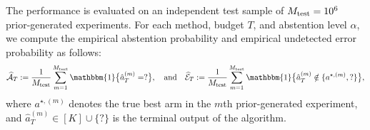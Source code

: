 \documentclass[10pt]{article}
\theoremstyle{plain}
\begin{document}
The performance is evaluated on an independent test sample of
\(M_{\rm test}=10^6\) prior-generated experiments. For each method, budget \(T\),
and abstention level \(\alpha\), we %
compute the empirical abstention probability and empirical
undetected error probability as follows:
\[
    \widehat{\mathcal A}_T
    :=
    \frac1{M_{\rm test}}
    \sum_{m=1}^{M_{\rm test}}
    \mathbbm{1}\big\{\hat a_T^{(m)}=?\big\} ,\quad
    \mbox{and}
    \quad
     \widehat{\mathcal E}_T
    :=
    \frac1{M_{\rm test}}
    \sum_{m=1}^{M_{\rm test}}
    \mathbbm{1}\big\{
        \hat a_T^{(m)}\notin\{a^{\star,(m)},?\}
    \big\},
\]
where \(a^{\star,(m)}\) denotes the true best arm in the \(m\)th prior-generated
experiment, and \(\hat a_T^{(m)}\in[K]\cup\{?\}\) is the terminal output of the
algorithm.

\end{document}
